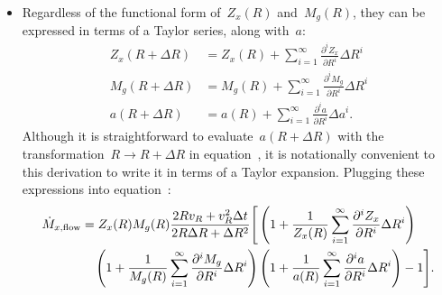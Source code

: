 \documentclass[main.tex]{subfiles}
\begin{document}
\begin{itemize}
	\item Regardless of the functional form of~$Z_x(R)$ and~$M_g(R)$, they can
	be expressed in terms of a Taylor series, along with~$a$:
	\begin{subequations}\begin{align}
	Z_x(R + \Delta R) &= Z_x(R) +
	\sum_{i = 1}^\infty \frac{\partial^i Z_x}{\partial R^i} \Delta R^i
	\\
	M_g(R + \Delta R) &= M_g(R) +
	\sum_{i = 1}^\infty \frac{\partial^i M_g}{\partial R^i} \Delta R^i
	\\
	a(R + \Delta R) &= a(R) +
	\sum_{i = 1}^\infty \frac{\partial^i a}{\partial R^i} \Delta a^i.
	\end{align}\end{subequations}
	Although it is straightforward to evaluate~$a(R + \Delta R)$ with the
	transformation~$R \rightarrow R + \Delta R$ in
	equation~, it is notationally convenient to
	this derivation to write it in terms of a Taylor expansion.
	Plugging these expressions into
	equation~:
	\begin{equation}\begin{split}
	\dot{M}_{x,\text{flow}} &= Z_x(R) M_g(R)
	\frac{2 R v_R + v_R^2 \Delta t}{2 R \Delta R + \Delta R^2}
	\Bigg[
	\left(1 + \frac{1}{Z_x(R)}
	\sum_{i = 1}^\infty \frac{\partial^i Z_x}{\partial R^i} \Delta R^i\right)
	\\
	&\quad
	\left(1 + \frac{1}{M_g(R)}
	\sum_{i = 1}^\infty \frac{\partial^i M_g}{\partial R^i} \Delta R^i\right)
	\left(1 + \frac{1}{a(R)}
	\sum_{i = 1}^\infty \frac{\partial^i a}{\partial R^i} \Delta R^i\right)
	- 1\Bigg].
	\end{split}\end{equation}


\end{itemize}
\end{document}
